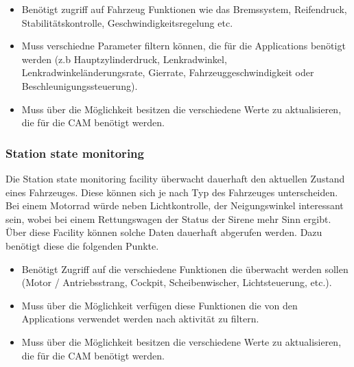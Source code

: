 \begin{itemize}
\item Benötigt zugriff auf Fahrzeug Funktionen wie das Bremssystem, Reifendruck, Stabilitätskontrolle, Geschwindigkeitsregelung etc.
\item Muss verschiedne Parameter filtern können, die für die Applications benötigt werden (z.b Hauptzylinderdruck, Lenkradwinkel, Lenkradwinkeländerungsrate, Gierrate, Fahrzeuggeschwindigkeit oder Beschleunigungssteuerung).
\item Muss über die Möglichkeit besitzen die verschiedene Werte zu aktualisieren, die für die \ac{CAM} benötigt werden.
\end{itemize}

\subsubsection{Station state monitoring \label{facilitylayer_StationStateMonitoring}}
Die Station state monitoring facility überwacht dauerhaft den aktuellen Zustand eines Fahrzeuges. Diese können sich je nach Typ des Fahrzeuges unterscheiden. Bei einem Motorrad würde neben Lichtkontrolle, der Neigungswinkel interessant sein, wobei bei einem Rettungswagen der Status der Sirene mehr Sinn ergibt. Über diese Facility können solche Daten dauerhaft abgerufen werden. 
Dazu benötigt diese die folgenden Punkte.
\begin{itemize}
\item Benötigt Zugriff auf die verschiedene Funktionen die überwacht werden sollen (Motor / Antriebsstrang, Cockpit, Scheibenwischer, Lichtsteuerung, etc.).
\item Muss über die Möglichkeit verfügen diese Funktionen die von den Applications verwendet werden nach aktivität zu filtern.
\item Muss über die Möglichkeit besitzen die verschiedene Werte zu aktualisieren, die für die \acl{CAM} benötigt werden.
\end{itemize}

